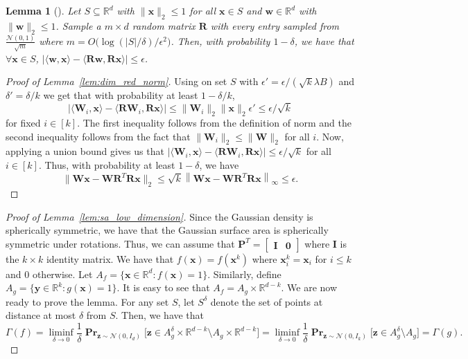 \documentclass[10pt,a4paper]{article}
\newtheorem{lemma}{Lemma}[section]
\newcommand\twonorm[1]{\|#1\|_2}
\newcommand\norm[1]{\left\| #1 \right\|}
\renewcommand\vec[1]{\mathbf{#1}}
\DeclareMathOperator*{\pr}{\mathbf{Pr}}
\newcommand{\R}{\mathbb{R}}
\newcommand{\1}{\Ind}
\newcommand{\x}{\vec x}
\newcommand{\vw}{\vec w}
\newcommand{\z}{\vec z}
\newcommand{\Gauss}{\mathcal{N}}
\begin{document}
\begin{lemma}[\cite{ArriagaVempala:99}]
\label{thm:ArriagaVempala:99}
    Let $S\subseteq \R^d$ with $\twonorm{\x}\leq 1$ for all $\x\in S$ and $\vw\in \R^{d}$ with $\twonorm{\vw}\leq 1$. Sample a $m\times d$ random matrix $\vec R$ with every entry sampled from $\frac{\Gauss(0,1)}{\sqrt{m}}$  where $m=O\bigl(\log (|S|/\delta)/\epsilon^2\bigr)$. Then, with probability $1-\delta$, we have that $\forall \x\in S$, $|\langle \vw,\x\rangle -\langle \vec R\vw,\vec R\x\rangle|\leq \epsilon$.
\end{lemma}
\begin{proof}[Proof of Lemma~\ref{lem:dim_red_norm}]
\label{proof:lem_dim_red_norm}
    Using  on set $S$ with $\epsilon'=\epsilon/(\sqrt{k}\lambda B)$ and $\delta'=\delta/k$ we get that with probability at least $1-\delta/k$, 
    \[
    |\langle \vec W_i,\x\rangle -\langle \vec R\vec W_i, \vec R\x\rangle|\leq \twonorm{\vec W_i}\twonorm{\x}\epsilon'\leq \epsilon/\sqrt{k}
    \]
    for fixed $i\in [k]$. The first inequality follows from the definition of norm and the second inequality follows from the fact that $\twonorm{\vec W_{i}}\leq \twonorm{\vec W}$ for all $i$. Now, applying a union bound gives us that $|\langle \vec W_i,\x\rangle -\langle \vec R\vec W_i, \vec R\x\rangle|\leq \epsilon/\sqrt{k}$ for all $i\in [k]$. Thus, with probability at least $1-\delta$, we have
    \[
    \twonorm{\vec W \x-\vec W\vec R^T\vec R\x}\leq \sqrt{k}\norm{\vec W \x-\vec W\vec R^T\vec R\x}_{\infty}\leq \epsilon. %
    \]
\end{proof}


\begin{proof}[Proof of Lemma~\ref{lem:sa_low_dimension}]
\label{proof:sa_low_dimension}
Since the Gaussian density is spherically symmetric, we have that the Gaussian surface area is spherically symmetric under rotations. Thus, we can assume that $\vec P^T=\begin{bmatrix}\vec I & \vec 0\end{bmatrix}$ where $\vec I$ is the $k\times k$ identity matrix. We have that $f(\x)=f(\x^k)$ where $\x^k_i=\x_i$ for $i\leq k$ and $0$ otherwise. Let $A_f = \{\x\in\R^d: f(\x)=1\}$. Similarly, define $A_g=\{\vec y\in \R^{k}: g(\x)=1\}$. It is easy to see that $A_f=A_g\times \R^{d-k}$. We are now ready to prove the lemma. For any set $S$, let $S^{\delta}$ denote the set of points at distance at most $\delta$ from $S$. Then, we have that \[\Gamma(f) = \liminf_{\delta \to 0} \frac{1}{\delta} \pr_{\z\sim\Gauss(0,I_d)}\bigr[\z \in A_g^\delta\times \R^{d-k} \setminus A_g\times \R^{d-k}\bigr]=\liminf_{\delta \to 0} \frac{1}{\delta} \pr_{\z\sim\Gauss(0,I_k)}\bigr[\z \in A_g^\delta \setminus A_g\bigr]=\Gamma(g).\]
\end{proof}
\end{document}
